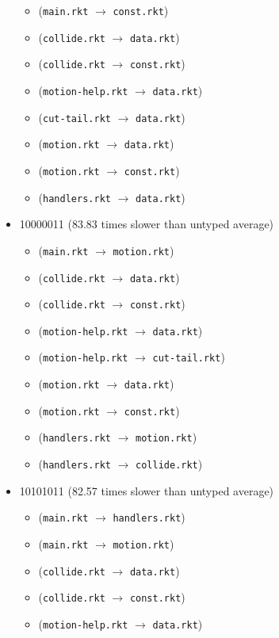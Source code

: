 \documentclass{article}
\newcommand{\mono}[1]{\texttt{#1}}
\begin{document}
\begin{itemize}
\begin{itemize}
  \item (\mono{main.rkt} $\rightarrow$ \mono{const.rkt})
  \item (\mono{collide.rkt} $\rightarrow$ \mono{data.rkt})
  \item (\mono{collide.rkt} $\rightarrow$ \mono{const.rkt})
  \item (\mono{motion-help.rkt} $\rightarrow$ \mono{data.rkt})
  \item (\mono{cut-tail.rkt} $\rightarrow$ \mono{data.rkt})
  \item (\mono{motion.rkt} $\rightarrow$ \mono{data.rkt})
  \item (\mono{motion.rkt} $\rightarrow$ \mono{const.rkt})
  \item (\mono{handlers.rkt} $\rightarrow$ \mono{data.rkt})
  \end{itemize}
\item 10000011 (83.83 times slower than untyped average)
  \begin{itemize}
  \item (\mono{main.rkt} $\rightarrow$ \mono{motion.rkt})
  \item (\mono{collide.rkt} $\rightarrow$ \mono{data.rkt})
  \item (\mono{collide.rkt} $\rightarrow$ \mono{const.rkt})
  \item (\mono{motion-help.rkt} $\rightarrow$ \mono{data.rkt})
  \item (\mono{motion-help.rkt} $\rightarrow$ \mono{cut-tail.rkt})
  \item (\mono{motion.rkt} $\rightarrow$ \mono{data.rkt})
  \item (\mono{motion.rkt} $\rightarrow$ \mono{const.rkt})
  \item (\mono{handlers.rkt} $\rightarrow$ \mono{motion.rkt})
  \item (\mono{handlers.rkt} $\rightarrow$ \mono{collide.rkt})
  \end{itemize}
\item 10101011 (82.57 times slower than untyped average)
  \begin{itemize}
  \item (\mono{main.rkt} $\rightarrow$ \mono{handlers.rkt})
  \item (\mono{main.rkt} $\rightarrow$ \mono{motion.rkt})
  \item (\mono{collide.rkt} $\rightarrow$ \mono{data.rkt})
  \item (\mono{collide.rkt} $\rightarrow$ \mono{const.rkt})
  \item (\mono{motion-help.rkt} $\rightarrow$ \mono{data.rkt})

\end{itemize}
\end{itemize}
\end{document}
